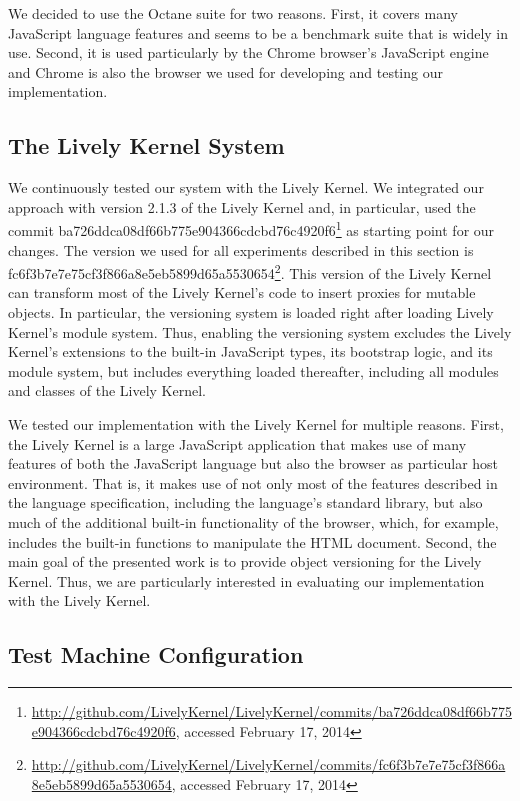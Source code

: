 We decided to use the Octane suite for two reasons.
First, it covers many JavaScript language features and seems to be a benchmark suite that is widely in use.
Second, it is used particularly by the Chrome browser's JavaScript engine and Chrome is also the browser we used for developing and testing our implementation.


\subsection{The Lively Kernel System}

We continuously tested our system with the Lively Kernel.
We integrated our approach with version 2.1.3 of the Lively Kernel and, in particular, used the commit ba726ddca08df66b775e904366cdcbd76c4920f6\footnote{\url{http://github.com/LivelyKernel/LivelyKernel/commits/ba726ddca08df66b775e904366cdcbd76c4920f6}, accessed February 17, 2014} as starting point for our changes.
The version we used for all experiments described in this section is fc6f3b7e7e75cf3f866a8e5eb5899d65a5530654\footnote{\url{http://github.com/LivelyKernel/LivelyKernel/commits/fc6f3b7e7e75cf3f866a8e5eb5899d65a5530654}, accessed February 17, 2014}.
This version of the Lively Kernel can transform most of the Lively Kernel's code to insert proxies for mutable objects.
In particular, the versioning system is loaded right after loading Lively Kernel's module system.
Thus, enabling the versioning system excludes the Lively Kernel's extensions to the built-in JavaScript types, its bootstrap logic, and its module system, but includes everything loaded thereafter, including all modules and classes of the Lively Kernel.

We tested our implementation with the Lively Kernel for multiple reasons.
First, the Lively Kernel is a large JavaScript application that makes use of many features of both the JavaScript language but also the browser as particular host environment.
That is, it makes use of not only most of the features described in the language specification, including the language's standard library, but also much of the additional built-in functionality of the browser, which, for example, includes the built-in functions to manipulate the HTML document.
Second, the main goal of the presented work is to provide object versioning for the Lively Kernel.
Thus, we are particularly interested in evaluating our implementation with the Lively Kernel.


\subsection{Test Machine Configuration}

